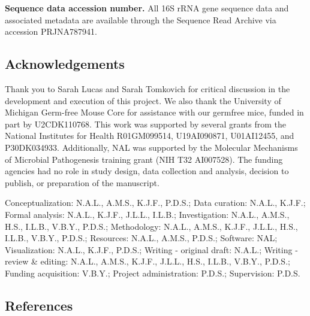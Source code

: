 \documentclass[
  12pt,
]{article}
\begin{document}
\textbf{Sequence data accession number.} All 16S rRNA gene sequence data
and associated metadata are available through the Sequence Read Archive
via accession PRJNA787941.

\hypertarget{acknowledgements}{%
\subsection{Acknowledgements}\label{acknowledgements}}

Thank you to Sarah Lucas and Sarah Tomkovich for critical discussion in
the development and execution of this project. We also thank the
University of Michigan Germ-free Mouse Core for assistance with our
germfree mice, funded in part by U2CDK110768. This work was supported by
several grants from the National Institutes for Health R01GM099514,
U19AI090871, U01AI12455, and P30DK034933. Additionally, NAL was
supported by the Molecular Mechanisms of Microbial Pathogenesis training
grant (NIH T32 AI007528). The funding agencies had no role in study
design, data collection and analysis, decision to publish, or
preparation of the manuscript.

Conceptualization: N.A.L., A.M.S., K.J.F., P.D.S.; Data curation:
N.A.L., K.J.F.; Formal analysis: N.A.L., K.J.F., J.L.L., I.L.B.;
Investigation: N.A.L., A.M.S., H.S., I.L.B., V.B.Y., P.D.S.;
Methodology: N.A.L., A.M.S., K.J.F., J.L.L., H.S., I.L.B., V.B.Y.,
P.D.S.; Resources: N.A.L., A.M.S., P.D.S.; Software: NAL; Visualization:
N.A.L., K.J.F., P.D.S.; Writing - original draft: N.A.L.; Writing -
review \& editing: N.A.L., A.M.S., K.J.F., J.L.L., H.S., I.L.B., V.B.Y.,
P.D.S.; Funding acquisition: V.B.Y.; Project administration: P.D.S.;
Supervision: P.D.S.

\newpage

\hypertarget{references}{%
\subsection{References}\label{references}}
\end{document}
